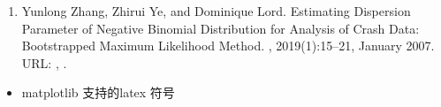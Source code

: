 \documentclass[letterpaper,10pt,english]{sphinxmanual}
\begin{document}
\begin{enumerate}
\item {} 
Yunlong Zhang, Zhirui Ye, and Dominique Lord. Estimating Dispersion Parameter of Negative Binomial Distribution for Analysis of Crash Data: Bootstrapped Maximum Likelihood Method. , 2019(1):15–21, January 2007. URL: , .

\end{enumerate}
\begin{itemize}
\item {} 
matplotlib 支持的latex 符号 

\end{itemize}



\renewcommand{\indexname}{索引}
\printindex
\end{document}
